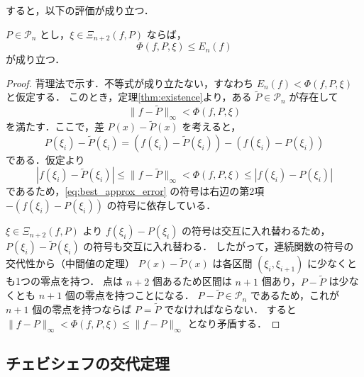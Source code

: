     すると，以下の評価が成り立つ．

    \begin{lemma}
      \label{lem:lower_bound}
      $P \in \mathcal{P}_n$ とし，$\xi \in \Xi_{n+2}(f, P)$ ならば，
      \begin{equation}
        \Phi(f, P, \xi) \le E_n(f)
      \end{equation}
      が成り立つ．
    \end{lemma}

    \begin{proof}
      背理法で示す．不等式が成り立たない，すなわち $E_n(f) < \Phi(f, P, \xi)$ と仮定する．
      このとき，定理\ref{thm:existence}より，ある $\tilde{P} \in \mathcal{P}_n$ が存在して
      \begin{equation}
        \| f - \tilde{P} \|_\infty < \Phi(f, P, \xi)
      \end{equation}
      を満たす．ここで，差 $P(x) - \tilde{P}(x)$ を考えると，
      \begin{equation}
        P(\xi_i) - \tilde{P}(\xi_i) = (f(\xi_i) - \tilde{P}(\xi_i)) - (f(\xi_i) - P(\xi_i)) \label{eq:best_approx_error}
      \end{equation}
      である．仮定より
      \begin{equation}
      |f(\xi_i) - \tilde{P}(\xi_i)| \le \| f - \tilde{P} \|_\infty < \Phi(f, P, \xi) \le |f(\xi_i) - P(\xi_i)|
      \end{equation}
      であるため，\eqref{eq:best_approx_error} の符号は右辺の第2項 $-(f(\xi_i) - P(\xi_i))$ の符号に依存している．
      
      $\xi \in \Xi_{n+2}(f, P)$ より $f(\xi_i) - P(\xi_i)$ の符号は交互に入れ替わるため，$P(\xi_i) - \tilde{P}(\xi_i)$ の符号も交互に入れ替わる．
      したがって，連続関数の符号の交代性から（中間値の定理） $P(x) - \tilde{P}(x)$ は各区間 $(\xi_i, \xi_{i+1})$ に少なくとも1つの零点を持つ．
      点は $n+2$ 個あるため区間は $n+1$ 個あり，$P - \tilde{P}$ は少なくとも $n+1$ 個の零点を持つことになる．
      $P - \tilde{P} \in \mathcal{P}_n$ であるため，これが $n+1$ 個の零点を持つならば $P = \tilde{P}$ でなければならない．
      すると $\| f - P \|_\infty < \Phi(f, P, \xi) \le \| f - P \|_\infty$ となり矛盾する．
    \end{proof}

  \label{subsec:alternation_theorem}
  \subsection{チェビシェフの交代定理}

